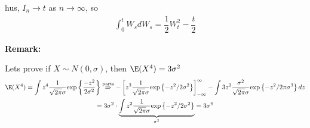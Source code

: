 \noindent hus, $I_n\to t$ as $n\to\infty$, so
\begin{equation*}
  \begin{gathered}
    \int_{0}^{t}W_sdW_s = \dfrac{1}{2}W_t^2-\dfrac{t}{2}
  \end{gathered}
\end{equation*}
\par\bigskip
\noindent\textbf{Remark:}\par
\noindent Lets prove if $X\sim N(0,\sigma)$, then $\E(X^4) = 3\sigma^2$
\begin{equation*}
  \begin{gathered}
    \E(X^4) = \int z^4\dfrac{1}{\sqrt{2\pi}\sigma}\text{exp}\left\{\dfrac{-z^2}{2\sigma^2}\right\}\stackrel{\text{parts}}{\Rightarrow} -\left[z^3\dfrac{1}{\sqrt{2\pi}\sigma}\text{exp}\left\{-z^2/2\sigma^2\right\}\right]_{-\infty}^\infty-\int 3z^2\dfrac{\sigma^2}{\sqrt{2\pi}\sigma}\text{exp}\left\{-z^2/2\pi\sigma^3\right\}dz\\
    = 3\sigma^2\cdot\underbrace{\int z^2\dfrac{1}{\sqrt{2\pi}\sigma}\text{exp}\left\{-z^2/2\sigma^2\right\}}_{\sigma^2} = 3\sigma^4
  \end{gathered}
\end{equation*}
\par\bigskip
